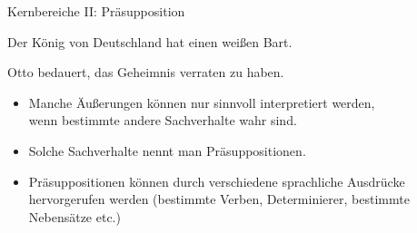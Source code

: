  \begin{frame}{Kernbereiche II: Präsupposition}

\begin{exe}     
        \ex Der König von Deutschland hat einen weißen Bart.\\


        \ex Otto bedauert, das Geheimnis verraten zu haben.\\


\end{exe}



\begin{itemize}
\item Manche Äußerungen können nur sinnvoll interpretiert werden,\\
      wenn bestimmte andere Sachverhalte wahr sind.\pause
\item Solche Sachverhalte nennt man \alert{Präsuppositionen}. \pause
\item Präsuppositionen können durch verschiedene sprachliche Ausdrücke hervorgerufen werden (bestimmte Verben, Determinierer, bestimmte Nebensätze etc.)
\end{itemize}

\end{frame}




